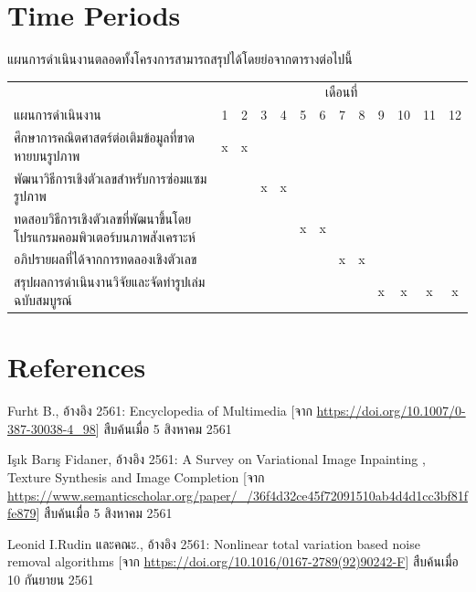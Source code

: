 \documentclass[hidelinks,a4paper,14pt]{article}
\numberwithin{equation}{section}							%
\begin{document}
{\section{Time Periods}
แผนการดำเนินงานตลอดทั้งโครงการสามารถสรุปได้โดยย่อจากตารางต่อไปนี้
\begin{center}
	\begin{tabular}[ht]{|l|c|c|c|c|c|c|c|c|c|c|c|c|}
		\hline
		&\multicolumn{12}{c|}{เดือนที่}\\
		\cline{2-13}
		แผนการดำเนินงาน&1&2&3&4&5&6&7&8&9&10&11&12\\
		\hline
		ศึกษาการคณิตศาสตร์ต่อเติมข้อมูลที่ขาดหายบนรูปภาพ&x&x& & & & & & & & & &\\
		พัฒนาวิธีการเชิงตัวเลขสำหรับการซ่อมแซมรูปภาพ& & &x&x& & & & & & & &\\
		ทดสอบวิธีการเชิงตัวเลขที่พัฒนาขึ้นโดยโปรแกรมคอมพิวเตอร์บนภาพสังเคราะห์& & & & &x&x& & & & & &\\
		อภิปรายผลที่ได้จากการทดลองเชิงตัวเลข & & & & & & &x&x& & & &\\
		สรุปผลการดำเนินงานวิจัยและจัดทำรูปเล่มฉบับสมบูรณ์& & & & & & & & &x&x&x&x\\
		\hline
	\end{tabular}
\end{center}




\section{References}

\renewcommand{\section}[2]{} %
\begin{thebibliography}{}
	Furht B., อ้างอิง 2561: Encyclopedia of Multimedia [จาก \url{https://doi.org/10.1007/0-387-30038-4_98}] สืบค้นเมื่อ 5 สิงหาคม 2561
	
	Işık Barış Fidaner, อ้างอิง 2561: A Survey on Variational Image Inpainting , Texture Synthesis and Image Completion [จาก \url{https://www.semanticscholar.org/paper/_/36f4d32ce45f72091510ab4d4d1cc3bf81ffe879}] สืบค้นเมื่อ 5 สิงหาคม 2561
	
	Leonid I.Rudin และคณะ., อ้างอิง 2561: Nonlinear total variation based noise removal algorithms [จาก \url{https://doi.org/10.1016/0167-2789(92)90242-F}] สืบค้นเมื่อ 10 กันยายน 2561
	

\end{thebibliography}}
\end{document}
